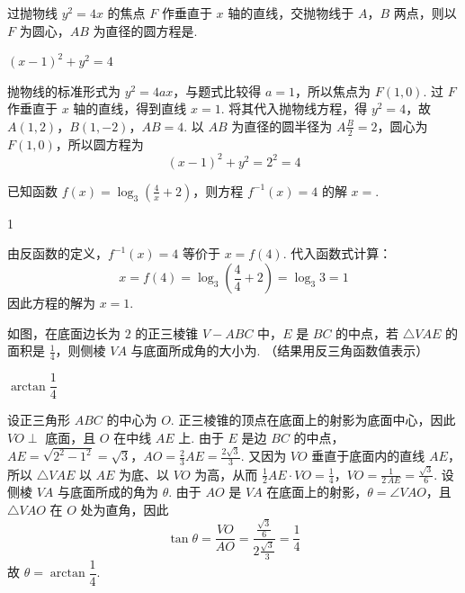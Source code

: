 \begin{problem}
过抛物线 \(y^{2}=4x\) 的焦点 \(F\) 作垂直于 \(x\) 轴的直线，交抛物线于 \(A\)，\(B\) 两点，则以 \(F\) 为圆心，\(AB\) 为直径的圆方程是\fillinblank{}.
\end{problem}

\begin{answer}
\((x-1)^2+y^2=4\)
\end{answer}

\begin{solution}
抛物线的标准形式为 \(y^2=4ax\)，与题式比较得 \(a=1\)，所以焦点为 \(F(1,0)\). 过 \(F\) 作垂直于 \(x\) 轴的直线，得到直线 \(x=1\). 将其代入抛物线方程，得 \(y^2=4\)，故
\(A(1,2)\)，\(B(1,-2)\)，\(AB=4\).
以 \(AB\) 为直径的圆半径为 \(A\frac{B}{2}=2\)，圆心为 \(F(1,0)\)，所以圆方程为
\[
(x-1)^2+y^2=2^2=4
\]
\end{solution}

\begin{problem}
已知函数 \(f(x)=\log_3\left(\frac{4}{x}+2\right)\)，则方程 \(f^{-1}(x)=4\) 的解 \(x=\)\fillinblank{}.
\end{problem}

\begin{answer}
1
\end{answer}

\begin{solution}
由反函数的定义，\(f^{-1}(x)=4\) 等价于 \(x=f(4)\). 代入函数式计算：
\[
x=f(4)=\log_3\left(\frac{4}{4}+2\right)=\log_3 3=1
\]
因此方程的解为 \(x=1\).
\end{solution}

\begin{problem}
如图，在底面边长为 \(2\) 的正三棱锥 \(V-ABC\) 中，\(E\) 是 \(BC\) 的中点，若 \(\triangle VAE\) 的面积是 \(\frac{1}{4}\)，则侧棱 \(VA\) 与底面所成角的大小为\fillinblank{}. （结果用反三角函数值表示）
\end{problem}

\begin{answer}
\(\arctan\dfrac{1}{4}\)
\end{answer}

\begin{solution}
设正三角形 \(ABC\) 的中心为 \(O\). 正三棱锥的顶点在底面上的射影为底面中心，因此 \(VO\perp\) 底面，且 \(O\) 在中线 \(AE\) 上. 由于 \(E\) 是边 \(BC\) 的中点，
\(AE=\sqrt{2^2-1^2}=\sqrt{3}\)，\(AO=\frac{2}{3}AE=\frac{2\sqrt{3}}{3}\).
又因为 \(VO\) 垂直于底面内的直线 \(AE\)，所以 \(\triangle VAE\) 以 \(AE\) 为底、以 \(VO\) 为高，从而
\(\frac{1}{2}AE\cdot VO=\frac{1}{4}\)，\(VO=\frac{1}{2\,AE}=\frac{\sqrt{3}}{6}\).
设侧棱 \(VA\) 与底面所成的角为 \(\theta\). 由于 \(AO\) 是 \(VA\) 在底面上的射影，\(\theta=\angle VAO\)，且 \(\triangle VAO\) 在 \(O\) 处为直角，因此
\[
\tan\theta=\frac{VO}{AO}=\frac{\frac{\sqrt{3}}{6}}{2\frac{\sqrt{3}}{3}}=\frac{1}{4}
\]
故 \(\theta=\arctan\dfrac{1}{4}\).
\end{solution}

